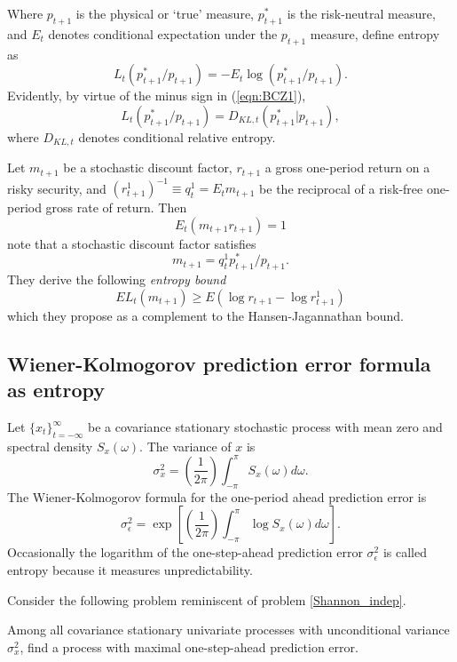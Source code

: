 \begin{subappendices}
Where $p_{t+1}$ is the physical or `true' measure, $p_{t+1}^*$ is the risk-neutral measure, and $E_t$ denotes conditional
expectation under the $p_{t+1}$ measure,
 \citet{BCZ2012}
 define entropy as
\begin{equation} \label{eqn:BCZ1}
L_t (p_{t+1}^*/p_{t+1}) = - E_t \log( p_{t+1}^*/p_{t+1}).
\end{equation}
Evidently, by virtue of the minus sign in (\ref{eqn:BCZ1}),
\begin{equation} \label{eqn:BCZ2}
L_t (p_{t+1}^*/p_{t+1})  = D_{KL,t}( p_{t+1}^*|p_{t+1}),
\end{equation}
where $D_{KL,t}$ denotes conditional relative entropy.

Let $m_{t+1}$ be a stochastic discount factor, $r_{t+1}$ a gross one-period return on a risky
security, and $(r_{t+1}^1)^{-1}\equiv q_t^1 = E_t m_{t+1}$ be the reciprocal of a risk-free one-period gross rate of return.
Then
\[ E_t (m_{t+1} r_{t+1}) = 1 \]
\citeauthor{BCZ2012} note that a stochastic discount factor satisfies
\[ m_{t+1} = q_t^1 p_{t+1}^*/p_{t+1} .\]
They derive the following {\em entropy bound}
\begin{equation}
E L_t (m_{t+1}) \geq E (\log r_{t+1} - \log r_{t+1}^1 )
\end{equation}
which they propose as a complement to the Hansen-Jagannathan bound.

\subsection{Wiener-Kolmogorov prediction error formula as entropy}

Let $\{x_t\}_{t=-\infty}^\infty$ be a covariance stationary stochastic process with
mean zero and spectral density $S_x(\omega)$. The variance of $x$ is
\[ \sigma_x^2 =\left( \frac{1}{2\pi}\right) \int_{-\pi}^\pi  S_x (\omega) d \omega . \]
The Wiener-Kolmogorov formula for the one-period ahead prediction error is
\begin{equation}\label{Shannon6}
\sigma_\epsilon^2 = \exp\left[\left( \frac{1}{2\pi}\right) \int_{-\pi}^\pi \log S_x (\omega) d \omega \right].
\end{equation}
Occasionally the logarithm of  the one-step-ahead prediction error $\sigma_\epsilon^2$
is called entropy because it measures unpredictability.

Consider the following problem  reminiscent of problem \ref{Shannon_indep}.

\begin{problem}\label{prob:Wiener_Kolm}
Among all covariance stationary univariate processes with unconditional variance $\sigma_x^2$, find a process with maximal
one-step-ahead prediction error.
\end{problem}


\end{subappendices}
